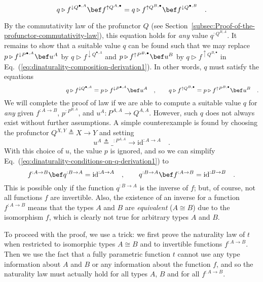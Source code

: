 ~
\[
q\triangleright f^{\downarrow Q^{\bullet,A}}\bef f^{\uparrow Q^{A,\bullet}}=q\triangleright f^{\uparrow Q^{B,\bullet}}\bef f^{\downarrow Q^{\bullet,B}}\quad.
\]

\noindent By the commutativity law of the profunctor $Q$ (see Section~\ref{subsec:Proof-of-the-profunctor-commutativity-law}),
this equation holds for \emph{any} value $q^{:Q^{B,A}}$. It remains
to show that a suitable value $q$ can be found such that we may replace
$p\triangleright f^{\downarrow P^{\bullet,A}}\bef u^{A}$ by $q\triangleright f^{\downarrow Q^{\bullet,A}}$
and $p\triangleright f^{\uparrow P^{B,\bullet}}\bef u^{B}$ by $q\triangleright f^{\uparrow Q^{B,\bullet}}$
in Eq.~(\ref{eq:dinaturality-composition-derivation1}). In other
words, $q$ must satisfy the equations
\begin{equation}
\quad\quad\quad\quad\quad\quad\quad\quad\quad\quad q\triangleright f^{\downarrow Q^{\bullet,A}}=p\triangleright f^{\downarrow P^{\bullet,A}}\bef u^{A}\quad,\quad\quad q\triangleright f^{\uparrow Q^{B,\bullet}}=p\triangleright f^{\uparrow P^{B,\bullet}}\bef u^{B}\quad.\label{eq:dinaturality-conditions-on-q-derivation1}
\end{equation}
We will complete the proof of law if we are able to compute a suitable
value $q$ for \emph{any} given $f^{:A\rightarrow B}$, $p^{:P^{B,A}}$,
and $u^{A}:P^{A,A}\rightarrow Q^{A,A}$. However, such $q$ does not
always exist without further assumptions. A simple counterexample
is found by choosing the profunctor $Q^{X,Y}\triangleq X\rightarrow Y$
and setting
\[
u^{A}\triangleq\_^{:P^{A,A}}\rightarrow\text{id}^{:A\rightarrow A}\quad.
\]
With this choice of $u$, the value $p$ is ignored, and so we can
simplify Eq.~(\ref{eq:dinaturality-conditions-on-q-derivation1})
to
\[
f^{:A\rightarrow B}\bef q^{:B\rightarrow A}=\text{id}^{:A\rightarrow A}\quad,\quad\quad q^{:B\rightarrow A}\bef f^{:A\rightarrow B}=\text{id}^{:B\rightarrow B}\quad.
\]
This is possible only if the function $q^{:B\rightarrow A}$ is the
inverse of $f$; but, of course, not all functions $f$ are invertible.
Also, the existence of an inverse for a function $f^{:A\rightarrow B}$
means that the types $A$ and $B$ are \emph{equivalent} ($A\cong B$)
due to the isomorphism $f$, which is clearly not true for arbitrary
types $A$ and $B$.

To proceed with the proof, we use a trick: we first prove the naturality
law of $t$ when restricted to isomorphic types $A\cong B$ and to
invertible functions $f^{:A\rightarrow B}$. Then we use the fact
that a fully parametric function $t$ cannot use any type information
about $A$ and $B$ or any information about the function $f$, and
so the naturality law must actually hold for all types $A$, $B$
and for all $f^{:A\rightarrow B}$.

